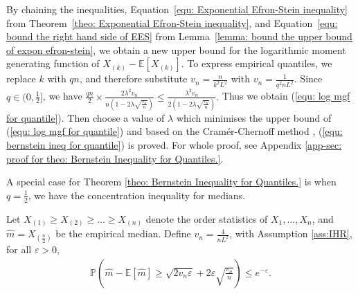 \begin{proof-sketch}
By chaining the inequalities,
Equation~\eqref{equ: Exponential Efron-Stein inequality} from Theorem~\ref{theo: Exponential Efron-Stein inequality}, and
Equation~\eqref{equ: bound the right hand side of EES} from Lemma~\ref{lemma: bound the upper bound of expon efron-stein},
we obtain a new upper bound for the logarithmic moment generating function of $X_{(k)} - \mathbb{E}[X_{(k)}]$.
To express empirical quantiles, we replace $k$ with $qn$, and therefore substitute
$v_n = \frac{n}{k^2 L^2}$ with $v_n = \frac{1}{q^2 n L^2}$. Since $q \in (0, \frac{1}{2}]$, we have
$\frac{qn}{2} \times \frac{2 \lambda^{2} v_{n} }{n\left(1-2 \lambda \sqrt{\frac{v_{n}}{n}}\right)}
\leq \frac{\lambda^{2}  v_{n}}{2 \left(1-2 \lambda \sqrt{\frac{v_{n}}{n}}\right)}.$
Thus we obtain (\ref{equ: log mgf for quantile}).
Then choose a value of $\lambda$ which minimises the upper bound of (\ref{equ: log mgf for quantile}) and based on the Cram\'er-Chernoff method \cite{boucheron2013}, (\ref{equ: bernstein ineq for quantile}) is proved.
For whole proof, see Appendix \ref{app-sec: proof for theo: Bernstein Inequality for Quantiles.}.
\end{proof-sketch}


A special case for Theorem \ref{theo: Bernstein Inequality for Quantiles.} is when $q = \frac{1}{2}$, we have the concentration inequality for medians.

\begin{coro}
\label{theo: Bernstein Inequality for Medians.}
Let $X_{\left(1\right)} \geq X_{\left(2\right)} \geq ... \geq X_{\left(n\right)}$ denote the order statistics of $X_1, ..., X_n$,
and $\hat{m} = X_{(\frac{n}{2})}$ be the empirical median. Define $v_n = \frac{4}{n L^2}$, with Assumption \ref{ass:IHR}, for all $\varepsilon > 0$,
\begin{align}
\label{equ: inequality Bernstein bound for median}
    \mathbb{P}\left( \hat{m}-\mathbb{E}[\hat{m}] \geq \sqrt{2 v_{n} \varepsilon}+2 \varepsilon \sqrt{\frac{v_{n}}{n}}\right) \leq  e^{-\varepsilon}.
\end{align}
\end{coro}

